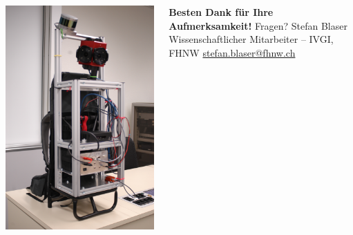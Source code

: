\documentclass[aspectratio=169]{beamer}
\begin{document}
\begin{frame}
   \begin{columns}[onlytextwidth]
    \begin{column}{0.33\textwidth}
      \includegraphics[height=0.7\textheight]{./Abbildungen/cappro_3.JPG}
    \end{column}
    \begin{column}{0.66\textwidth}
      \textbf{Besten Dank für Ihre Aufmerksamkeit!} \newline
      Fragen? \newline
      \newline
      Stefan Blaser\newline
      Wissenschaftlicher Mitarbeiter -- IVGI, FHNW\newline
      \href{mailto:stefan.blaser@fhnw.ch}{stefan.blaser@fhnw.ch}
    \end{column}
  \end{columns}
\end{frame}
\end{document}
